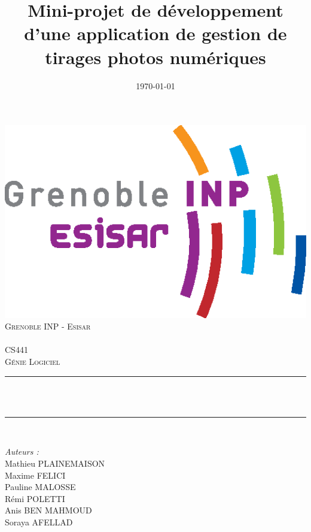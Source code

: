 \documentclass{article}
\title{Mini-projet de développement d'une application de gestion de
tirages photos numériques}
\date{\today}
\makeatletter
\let\thetitle\@title
\let\thedate\@date
\makeatother
\begin{document}
\begin{titlepage}
	\centering
    \vspace*{0.5 cm}
    \includegraphics[scale = 0.75]{logo}\\[1.0 cm]	%
    \textsc{\LARGE Grenoble INP - Esisar}\\[2.0 cm]	%
    	{\large \thedate}\\[0.3 cm]
	\textsc{\Large CS441}\\[0.3 cm]				%
	\textsc{\large Génie Logiciel}\\[0.3 cm]				%
  \vspace{1\baselineskip}
  \vspace{1\baselineskip}
  \vspace{1\baselineskip}
	\rule{\linewidth}{0.2 mm} \\[0.4 cm]
	{ \huge \bfseries \thetitle}\\
	\rule{\linewidth}{0.2 mm} \\[1.5 cm]
\vspace{1\baselineskip}
\vspace{1\baselineskip}
\vspace{1\baselineskip}
	\begin{minipage}{0.4\textwidth}
		\begin{flushleft} \large
			\emph{Auteurs : }\\
      Mathieu PLAINEMAISON \\
      Maxime FELICI \\
      Pauline MALOSSE \\
      Rémi POLETTI \\
      Anis BEN MAHMOUD \\
      Soraya AFELLAD \\
			\end{flushleft}
			\end{minipage}~
      \begin{minipage}{0.4\textwidth}
			\begin{flushright} \large
		\end{flushright}
	\end{minipage}\\[2 cm]



	\vfill

\end{titlepage}
\end{document}
